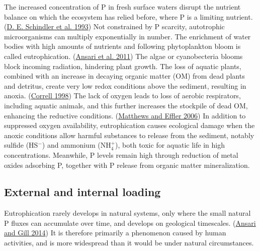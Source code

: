 \documentclass[a4paper,11pt]{article}
\begin{document}
The increased concentration of P in fresh surface waters disrupt the nutrient balance on which the ecosystem has relied before, where P is a limiting nutrient. (\protect\hyperlink{ref-schindlerFoodWebStructure1993}{D. E. Schindler et al. 1993}) Not constrained by P scarcity, autotrophic microorganisms can multiply exponentially in number. The enrichment of water bodies with high amounts of nutrients and following phytoplankton bloom is called eutrophication. (\protect\hyperlink{ref-ansariEutrophicationCausesConsequences2011}{Ansari et al. 2011}) The algae or cyanobecteria blooms block incoming radiation, hindering plant growth. The loss of aquatic plants, combined with an increase in decaying organic matter (OM) from dead plants and detritus, create very low redox conditions above the sediment, resulting in anoxia. (\protect\hyperlink{ref-correllRolePhosphorusEutrophication1998}{Correll 1998}) The lack of oxygen leads to loss of aerobic respirators, including aquatic animals, and this further increases the stockpile of dead OM, enhancing the reductive conditions. (\protect\hyperlink{ref-matthewsLongTermChanges2006}{Matthews and Effler 2006}) In addition to suppressed oxygen availability, eutrophication causes ecological damage when the anoxic conditions allow harmful substances to release from the sediment, notably sulfide (HS\(^-\)) and ammonium (NH\(_4^+\)), both toxic for aquatic life in high concentrations. Meanwhile, P levels remain high through reduction of metal oxides adsorbing P, together with P release from organic matter mineralization.

\hypertarget{external-and-internal-loading}{%
\subsection{External and internal loading}\label{external-and-internal-loading}}

Eutrophication rarely develops in natural systems, only where the small natural P fluxes can accumulate over time, and develops on geological timescales. (\protect\hyperlink{ref-ansariEutrophicationCausesConsequences2014}{Ansari and Gill 2014}) It is therefore primarily a phenomenon caused by human activities, and is more widespread than it would be under natural circumstances.
\end{document}
